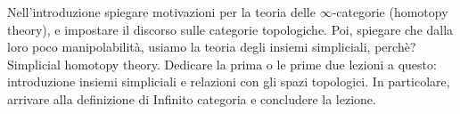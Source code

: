 Nell'introduzione spiegare motivazioni per la teoria delle $\infty$-categorie (homotopy theory), e impostare il discorso sulle categorie topologiche. Poi, spiegare che dalla loro poco manipolabilità, usiamo la teoria degli insiemi simpliciali, perchè? Simplicial homotopy theory. Dedicare la prima o le prime due lezioni a questo: introduzione insiemi simpliciali e relazioni con gli spazi topologici. \cite{boardman1973homotopy} In particolare, arrivare alla definizione di Infinito categoria e concludere la lezione.